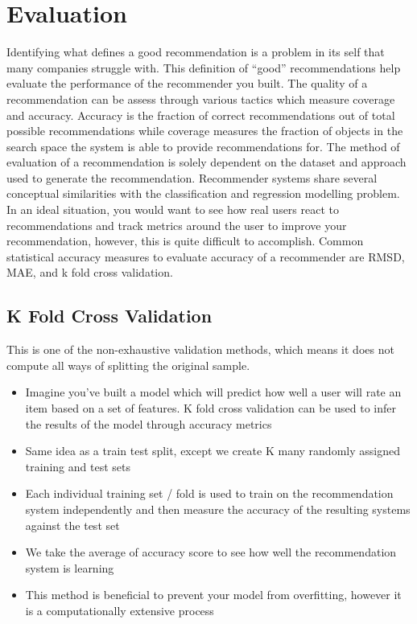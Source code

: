 \section{Evaluation}
Identifying what defines a good recommendation is a problem in its self that many companies struggle with. This definition of “good” recommendations help evaluate the performance of the recommender you built. The quality of a recommendation can be assess through various tactics which measure coverage and accuracy. Accuracy is the fraction of correct recommendations out of total possible recommendations while coverage measures the fraction of objects in the search space the system is able to provide recommendations for. The method of evaluation of a recommendation is solely dependent on the dataset and approach used to generate the recommendation. Recommender systems share several conceptual similarities with the classification and regression modelling problem. In an ideal situation, you would want to see how real users react to recommendations and track metrics around the user to improve your recommendation, however, this is quite difficult to accomplish. Common statistical accuracy measures to evaluate accuracy of a recommender are RMSD, MAE, and k fold cross validation.

\subsection{K Fold Cross Validation}
This is one of the non-exhaustive validation methods, which means it does not compute all ways of splitting the original sample.

\begin{itemize}
\item Imagine you’ve built a model which will predict how well a user will rate an item based on a set of features. K fold cross validation can be used to infer the results of the model through accuracy metrics
\item Same idea as a train test split, except we create K many randomly assigned training and test sets
\item Each individual training set / fold is used to train on the recommendation system independently and then measure the accuracy of the resulting systems against the test set
\item We take the average of accuracy score to see how well the recommendation system is learning
\item This method is beneficial to prevent your model from overfitting, however it is a computationally extensive process
\end{itemize}

